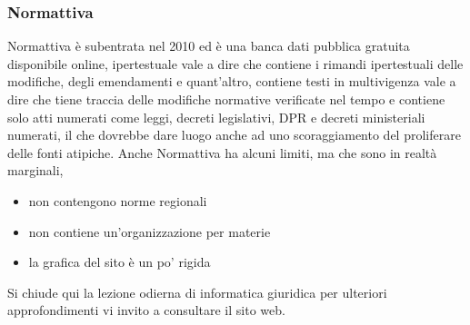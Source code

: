 \subsubsection{Normattiva}
Normattiva è subentrata nel 2010 ed è una banca dati pubblica gratuita disponibile online, ipertestuale vale a dire che contiene i rimandi ipertestuali delle modifiche, degli emendamenti e quant'altro, contiene testi in multivigenza vale a dire che tiene traccia delle modifiche normative verificate nel tempo e contiene solo atti numerati come leggi, decreti legislativi, DPR e decreti ministeriali numerati, il che dovrebbe dare luogo anche ad uno scoraggiamento del proliferare delle fonti atipiche. 
Anche Normattiva ha alcuni limiti, ma che sono in realtà marginali, 
\begin{itemize}
    \item non contengono norme regionali
    \item non contiene un'organizzazione per materie
    \item la grafica del sito è un po' rigida 
\end{itemize}
Si chiude qui la lezione odierna di informatica giuridica per ulteriori approfondimenti vi invito a consultare il sito web.